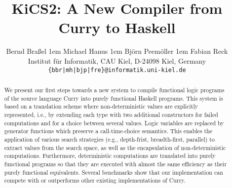 \documentclass{scrartcl}
\begin{document}
\title{KiCS2: A New Compiler from Curry to Haskell}

\author{
Bernd Bra\ss{}el
\kern1em
Michael Hanus
\kern1em
 Bj{\"o}rn Peem{\"o}ller
\kern1em
Fabian Reck \\
Institut f{\"u}r Informatik, CAU Kiel, D-24098 Kiel, Germany \\
\texttt{\{bbr|mh|bjp|fre\}@informatik.uni-kiel.de}}
\date{}
\maketitle
\thispagestyle{empty}

\begin{abstract}
We present our first steps towards a new system to compile functional logic
programs of the source language Curry into purely functional Haskell programs.
This system is based on a translation scheme where non-deterministic values
are explicitly represented, i.e., by extending each type with two additional
constructors for failed computations and for a choice between several values.
Logic variables are replaced by generator functions which preserve a
call-time-choice semantics. This enables the application of various search
strategies (e.g., depth-frist, breadth-first, parallel) to extract values from
the search space, as well as the encapsulation of non-deterministic
computations. Furthermore, deterministic computations are translated into purely
functional programs so that they are executed with almost the same efficiency as
their purely functional equivalents. Several benchmarks show that our
implementation can compete with or outperforms other existing implementations
of Curry.
\end{abstract}
\end{document}
